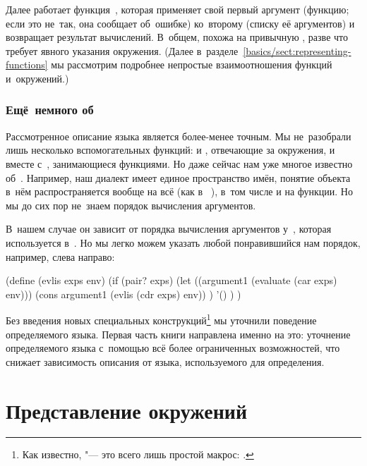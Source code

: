 Далее работает функция~, которая применяет свой первый аргумент
(функцию; если это не~так, она сообщает об~ошибке) ко~второму (списку её
аргументов) и возвращает результат вычислений. В~общем,  похожа на
привычную , разве что требует явного указания окружения. (Далее
в~разделе~\ref{basics/sect:representing-functions}
 мы рассмотрим подробнее непростые
взаимоотношения функций и~окружений.)


\subsubsection{\texorpdfstring{Ещё~немного об~\protect{}}%
{Ещё немного об evaluate}}

Рассмотренное описание языка является более-менее точным. Мы не~разобрали лишь
несколько вспомогательных функций:  и , отвечающие за
окружения, и  вместе с~, занимающиеся функциями.
Но даже сейчас нам уже многое известно об~. Например, наш диалект
имеет единое пространство имён, понятие объекта в~нём распространяется вообще
на всё (как в~ ), в~том числе и на функции.
Но мы до сих пор не~знаем порядок вычисления аргументов.

В~нашем случае он зависит от порядка вычисления аргументов у~, которая
используется в~. Но мы легко можем указать любой понравившийся нам
порядок, например, слева направо:

\begin{code:lisp}
(define (evlis exps env)
  (if (pair? exps)
      (let ((argument1 (evaluate (car exps) env)))
        (cons argument1 (evlis (cdr exps) env)) )
      '() ) )
\end{code:lisp}

Без введения новых специальных конструкций\footnote{Как известно,  "---
это всего лишь простой макрос:  {\eq}
.} мы уточнили поведение определяемого
языка. Первая часть книги направлена именно на это: уточнение определяемого
языка с~помощью всё более ограниченных возможностей, что снижает зависимость
описания от языка, используемого для определения.


\section{Представление окружений}\label{basics/sect:repr-the-env}

